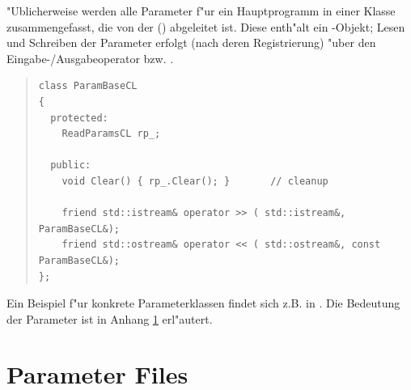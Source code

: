 \documentclass[11pt,a4paper]{article}
\newenvironment{Code}{\begin{quote}\scriptsize}{\end{quote}}
\begin{document}
"Ublicherweise werden alle Parameter f"ur ein Hauptprogramm in einer Klasse
zusammengefasst, die von der  () abgeleitet
ist. Diese enth"alt ein -Objekt; Lesen und Schreiben der
Parameter erfolgt (nach deren Registrierung) "uber den Eingabe-/Ausgabeoperator 
\prg{>>} bzw. \prg{<<}.
\begin{Code}
\begin{verbatim}
class ParamBaseCL
{
  protected:
    ReadParamsCL rp_;
    
  public:
    void Clear() { rp_.Clear(); }		// cleanup

    friend std::istream& operator >> ( std::istream&, ParamBaseCL&);
    friend std::ostream& operator << ( std::ostream&, const ParamBaseCL&);
};
\end{verbatim}
\end{Code}
Ein Beispiel f"ur konkrete Parameterklassen findet sich z.B. in 
. Die Bedeutung der Parameter ist in Anhang
\ref{s:ParamFiles} 
erl"autert.


				\appendix

\section{Parameter Files}
\label{s:ParamFiles}
\end{document}
